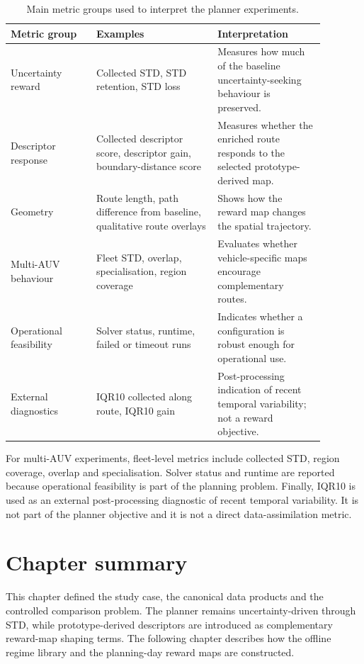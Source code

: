 \begin{table}[htbp]
    \centering
    \small
    \caption{Main metric groups used to interpret the planner experiments.}
    \label{tab:evaluation_metric_groups}
    \begin{tabular}{p{0.24\linewidth}p{0.34\linewidth}p{0.30\linewidth}}
        \hline
        Metric group & Examples & Interpretation \\
        \hline
        Uncertainty reward & Collected STD, STD retention, STD loss & Measures how much of the baseline uncertainty-seeking behaviour is preserved. \\
        Descriptor response & Collected descriptor score, descriptor gain, boundary-distance score & Measures whether the enriched route responds to the selected prototype-derived map. \\
        Geometry & Route length, path difference from baseline, qualitative route overlays & Shows how the reward map changes the spatial trajectory. \\
        Multi-AUV behaviour & Fleet STD, overlap, specialisation, region coverage & Evaluates whether vehicle-specific maps encourage complementary routes. \\
        Operational feasibility & Solver status, runtime, failed or timeout runs & Indicates whether a configuration is robust enough for operational use. \\
        External diagnostics & IQR10 collected along route, IQR10 gain & Post-processing indication of recent temporal variability; not a reward objective. \\
        \hline
    \end{tabular}
\end{table}

For multi-AUV experiments, fleet-level metrics include collected STD, region coverage, overlap and specialisation. Solver status and runtime are reported because operational feasibility is part of the planning problem. Finally, IQR10 is used as an external post-processing diagnostic of recent temporal variability. It is not part of the planner objective and it is not a direct data-assimilation metric.

\FloatBarrier
\section{Chapter summary}

This chapter defined the study case, the canonical data products and the controlled comparison problem. The planner remains uncertainty-driven through STD, while prototype-derived descriptors are introduced as complementary reward-map shaping terms. The following chapter describes how the offline regime library and the planning-day reward maps are constructed.



